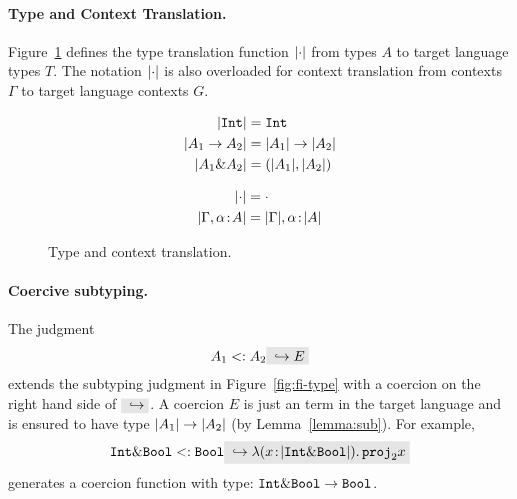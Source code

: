 \paragraph{Type and Context Translation.}

Figure~\ref{fig:type-and-context-translation} defines the type translation
function $\lvert \cdot \rvert$ from \name types $A$ to target language types $T$. The
notation $\lvert \cdot \rvert$ is also overloaded for context translation from \name
contexts $\Gamma$ to target language contexts $G$.

\begin{figure}[h]

  \begin{align*}
    \lvert \texttt{Int} \rvert     &= \texttt{Int} \\
    \lvert A_1 \to A_2 \rvert    &= \lvert A_1 \rvert \to \lvert A_2 \rvert \\
    \lvert A_1 \& A_2 \rvert &= (\lvert A_1 \rvert, \lvert A_2 \rvert) \\
  \end{align*}


  \begin{align*}
    \lvert \cdot \rvert                      &= \cdot \\
    \lvert \Gamma, \alpha \!:\! A \rvert &= \lvert \Gamma \rvert, \alpha \!:\! \lvert A \rvert
  \end{align*}

  \caption{Type and context translation.}
  \label{fig:type-and-context-translation}
\end{figure}


\paragraph{Coercive subtyping.}

The judgment
\[
A_1 \subtype A_2 \yields E
\]
extends the subtyping judgment in Figure~\ref{fig:fi-type} with a coercion
on the right hand side of $ \yields {} $. A coercion $ E $ is just an term
in the target language and is ensured to have type
$ \lvert A_1 \rvert \to \lvert A_2 \rvert $ (by Lemma~\ref{lemma:sub}). For example,
\[
\code{Int} \inter \code{Bool} \subtype \code{Bool} \yields {\lamty x {\im {\code{Int} \inter \code{Bool}}} {\proj 2 x}}
\]
generates a coercion function with type: $\texttt{Int} \& \texttt{Bool} \to \texttt{Bool}$.

